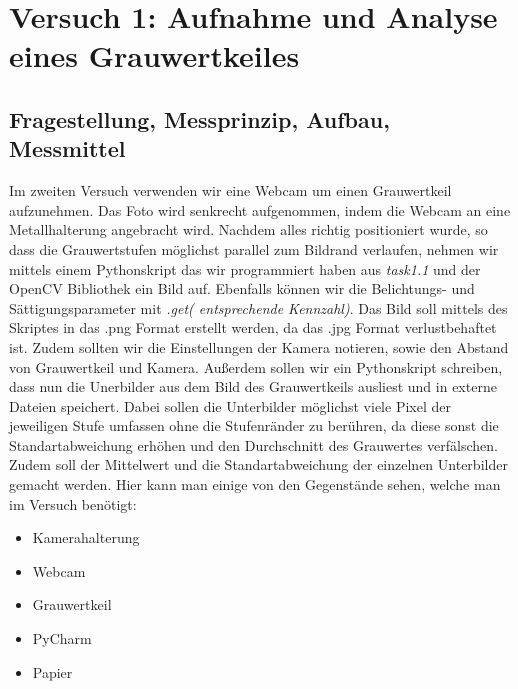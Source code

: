 \documentclass[12pt, oneside, a4paper, \docLanguage]{report}
\begin{document}
%
%
\chapter{Versuch 1: Aufnahme und Analyse eines Grauwertkeiles}
\label{chap:VERSUCH_1}

\section{Fragestellung, Messprinzip, Aufbau, Messmittel}
\label{chap:VERSUCH_1_FRAGESTELLUNG}
Im zweiten Versuch verwenden wir eine Webcam um einen Grauwertkeil aufzunehmen. Das Foto wird senkrecht aufgenommen, indem die Webcam an eine Metallhalterung angebracht wird.
Nachdem alles richtig positioniert wurde, so dass die Grauwertstufen möglichst parallel zum Bildrand verlaufen, nehmen wir mittels einem Pythonskript das wir programmiert haben aus \textit{task1.1} und der OpenCV Bibliothek ein Bild auf. Ebenfalls können wir die Belichtungs- und Sättigungsparameter mit \textit{.get( entsprechende Kennzahl)}. Das Bild soll mittels des Skriptes in das .png Format erstellt werden, da das .jpg Format verlustbehaftet ist. Zudem sollten wir die Einstellungen der Kamera notieren, sowie den Abstand von Grauwertkeil und Kamera.
\newline
\newline
Außerdem sollen wir ein Pythonskript schreiben, dass nun die Unerbilder aus dem Bild des Grauwertkeils ausliest und in externe Dateien speichert.
Dabei sollen die Unterbilder möglichst viele Pixel der jeweiligen Stufe umfassen ohne die Stufenränder zu berühren, da diese sonst die Standartabweichung erhöhen und den Durchschnitt des Grauwertes verfälschen.
\newline
Zudem soll der Mittelwert und die Standartabweichung der einzelnen Unterbilder gemacht werden.
\newpage
Hier kann man einige von den Gegenstände sehen, welche man im Versuch benötigt:~\par
\begin{itemize}
	\item Kamerahalterung
	\item Webcam
	\item Grauwertkeil
	\item PyCharm
	\item Papier
	
\end{itemize}
\end{document}

